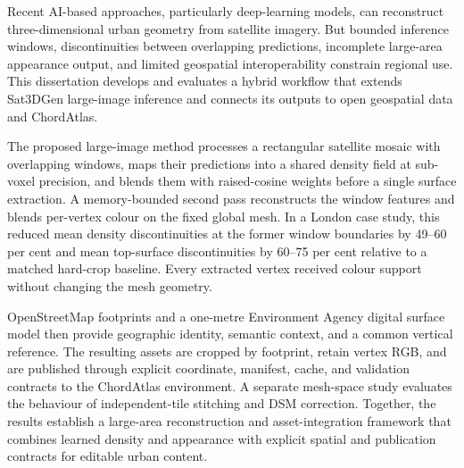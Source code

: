 Recent AI-based approaches, particularly deep-learning models, can reconstruct three-dimensional urban geometry from satellite imagery. But bounded inference windows, discontinuities between overlapping
predictions, incomplete large-area appearance output, and limited geospatial
interoperability constrain regional use.  This dissertation develops and
evaluates a hybrid workflow that extends Sat3DGen large-image inference and
connects its outputs to open geospatial data and ChordAtlas.

The proposed large-image method processes a rectangular satellite mosaic with
overlapping windows, maps their predictions into a shared density field at
sub-voxel precision, and blends them with raised-cosine weights before a single
surface extraction.  A memory-bounded second pass reconstructs the window
features and blends per-vertex colour on the fixed global mesh.  In a London case study, this reduced mean density discontinuities at the
former window boundaries by 49--60 per cent and mean top-surface
discontinuities by 60--75 per cent relative to a matched hard-crop baseline.
Every extracted vertex received colour support without changing the mesh
geometry.

OpenStreetMap footprints and a one-metre Environment Agency digital surface
model then provide geographic identity, semantic context, and a common
vertical reference.  The resulting assets are cropped by footprint, retain
vertex RGB, and are published through explicit coordinate, manifest, cache,
and validation contracts to the ChordAtlas environment.  A separate
mesh-space study evaluates the behaviour of independent-tile stitching and
DSM correction.  Together, the results establish a large-area reconstruction
and asset-integration framework that combines learned density and appearance
with explicit spatial and publication contracts for editable urban content.
